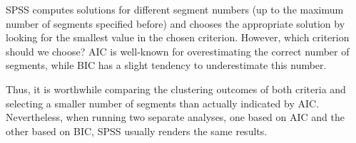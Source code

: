 \documentclass[a4paper,12pt]{article}
\begin{document}
SPSS computes solutions for different
segment numbers (up to the maximum number of segments specified before) and
chooses the appropriate solution by looking for the smallest value in the chosen
criterion. However, which criterion should we choose? AIC is well-known for
overestimating the correct number of segments, while BIC has a slight tendency
to underestimate this number.

Thus, it is worthwhile comparing the clustering
outcomes of both criteria and selecting a smaller number of segments than
actually indicated by AIC. Nevertheless, when running two separate analyses,
one based on AIC and the other based on BIC, SPSS usually renders the same
results.
\end{document}
